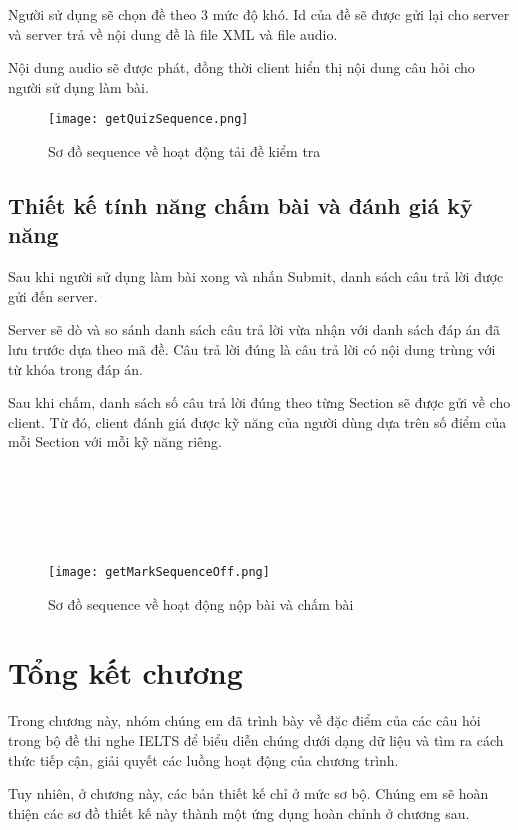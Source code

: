 Người sử dụng sẽ chọn đề theo 3 mức độ khó. Id của đề sẽ được gửi lại cho server và server trả về nội dung đề là file XML và file audio.

Nội dung audio sẽ được phát, đồng thời client hiển thị nội dung câu hỏi cho người sử dụng làm bài.

\begin{figure}[!htb] 
\centering
\texttt{[image: getQuizSequence.png]}
\caption{Sơ đồ sequence về hoạt động tải đề kiểm tra}
\end{figure}

\subsection{Thiết kế tính năng chấm bài và đánh giá kỹ năng}

Sau khi người sử dụng làm bài xong và nhấn Submit, danh sách câu trả lời được gửi đến server.

Server sẽ dò và so sánh danh sách câu trả lời vừa nhận với danh sách đáp án đã lưu trước dựa theo mã đề. Câu trả lời đúng là câu trả lời có nội dung trùng với từ khóa trong đáp án.

Sau khi chấm, danh sách số câu trả lời đúng theo từng Section sẽ được gửi về cho client. Từ đó, client đánh giá được kỹ năng của người dùng dựa trên số điểm của mỗi Section với mỗi kỹ năng riêng.\\
\\
\\
\\
\\
\\
\begin{figure}[!htb] 
\centering
\texttt{[image: getMarkSequenceOff.png]}
\caption{Sơ đồ sequence về hoạt động nộp bài và chấm bài}
\end{figure}

\section{Tổng kết chương}

Trong chương này, nhóm chúng em đã trình bày về đặc điểm của các câu hỏi trong bộ đề thi nghe IELTS để biểu diễn chúng dưới dạng dữ liệu và tìm ra cách thức tiếp cận, giải quyết các luồng hoạt động của chương trình.

Tuy nhiên, ở chương này, các bản thiết kế chỉ ở mức sơ bộ. Chúng em sẽ hoàn thiện các sơ đồ thiết kế này thành một ứng dụng hoàn chỉnh ở chương sau.
